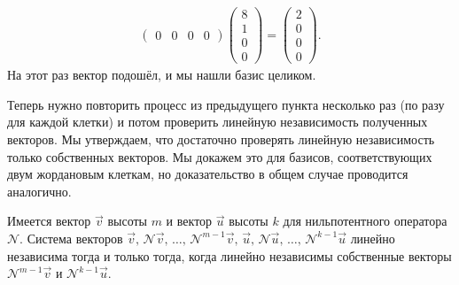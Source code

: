 \begin{solution}
\begin{gather*}
\begin{pmatrix}
			0 & 0 & 0 & 0
		\end{pmatrix}
		\begin{pmatrix}
			8\\
			1\\
			0\\
			0
		\end{pmatrix} =
		\begin{pmatrix}
			2\\
			0\\
			0\\
			0
		\end{pmatrix}.
	\end{gather*}
	На этот раз\footnotemark{} вектор подошёл, и мы нашли базис целиком.
\end{solution}


\medskip
{}
\smallskip

Теперь нужно повторить процесс из предыдущего пункта несколько раз (по разу для каждой клетки) и потом проверить линейную независимость полученных векторов. Мы утверждаем, что достаточно проверять линейную независимость только собственных векторов. Мы докажем это для базисов, соответствующих двум жордановым клеткам, но доказательство в общем случае проводится аналогично.

\begin{lemma}
	Имеется вектор $\vec{v}$ высоты $m$ и вектор $\vec{u}$ высоты $k$ для нильпотентного оператора $\mathcal{N}$. Система векторов $\vec{v},\,\mathcal{N}\vec{v},\,\ldots,\,\mathcal{N}^{m - 1}\vec{v},\,\vec{u},\,\mathcal{N}\vec{u},\,\ldots,\,\mathcal{N}^{k - 1}\vec{u}$ линейно независима тогда и только тогда, когда линейно независимы собственные векторы $\mathcal{N}^{m - 1}\vec{v}$ и $\mathcal{N}^{k - 1}\vec{u}$.
\end{lemma}

